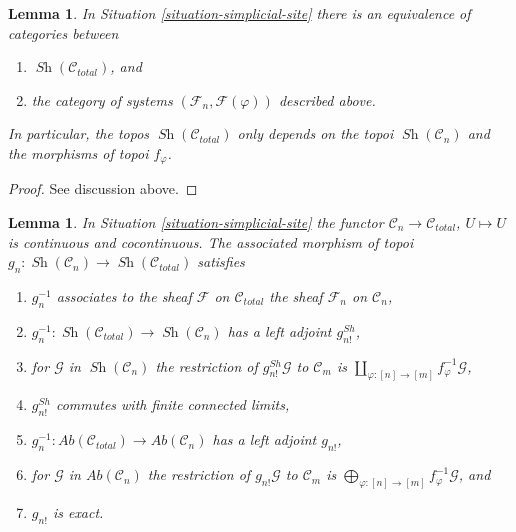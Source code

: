 \documentclass{stacks-project}
\theoremstyle{plain}
\newtheorem{lemma}[subsection]{Lemma}
\theoremstyle{definition}
\theoremstyle{remark}
\numberwithin{equation}{subsection}
\def\Sh{\mathop{\mathit{Sh}}\nolimits}
\begin{document}
\begin{lemma}
\label{lemma-describe-sheaves-simplicial-site-site}
In Situation \ref{situation-simplicial-site} there is an equivalence of
categories between
\begin{enumerate}
\item $\Sh(\mathcal{C}_{total})$, and
\item the category of systems $(\mathcal{F}_n, \mathcal{F}(\varphi))$
described above.
\end{enumerate}
In particular, the topos $\Sh(\mathcal{C}_{total})$ only depends on
the topoi $\Sh(\mathcal{C}_n)$ and the morphisms of topoi $f_\varphi$.
\end{lemma}

\begin{proof}
See discussion above.
\end{proof}

\begin{lemma}
\label{lemma-restriction-to-components-site}
In Situation \ref{situation-simplicial-site} the functor
$\mathcal{C}_n \to \mathcal{C}_{total}$, $U \mapsto U$ is continuous
and cocontinuous. The associated morphism of
topoi $g_n : \Sh(\mathcal{C}_n) \to \Sh(\mathcal{C}_{total})$ satisfies
\begin{enumerate}
\item $g_n^{-1}$ associates to the sheaf $\mathcal{F}$ on $\mathcal{C}_{total}$
the sheaf $\mathcal{F}_n$ on $\mathcal{C}_n$,
\item $g_n^{-1} : \Sh(\mathcal{C}_{total}) \to \Sh(\mathcal{C}_n)$
has a left adjoint $g^{Sh}_{n!}$,
\item for $\mathcal{G}$ in $\Sh(\mathcal{C}_n)$ the restriction of
$g_{n!}^{Sh}\mathcal{G}$ to $\mathcal{C}_m$ is
$\coprod\nolimits_{\varphi : [n] \to [m]} f_\varphi^{-1}\mathcal{G}$,
\item $g_{n!}^{Sh}$ commutes with finite connected limits,
\item $g_n^{-1} : \textit{Ab}(\mathcal{C}_{total}) \to
\textit{Ab}(\mathcal{C}_n)$ has a left adjoint $g_{n!}$,
\item for $\mathcal{G}$ in $\textit{Ab}(\mathcal{C}_n)$ the restriction of
$g_{n!}\mathcal{G}$ to $\mathcal{C}_m$ is
$\bigoplus\nolimits_{\varphi : [n] \to [m]} f_\varphi^{-1}\mathcal{G}$, and
\item $g_{n!}$ is exact.
\end{enumerate}
\end{lemma}
\end{document}
